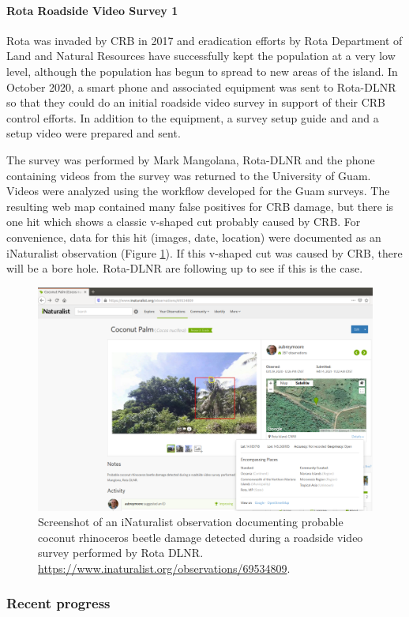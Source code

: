 \documentclass[12pt,letterpaper,english,bibliography=totocnumbered, abstract=on]{scrartcl}
\begin{document}
\clearpage
\paragraph{Rota Roadside Video Survey 1}

Rota was invaded by CRB in 2017 and eradication efforts by Rota Department of Land and Natural Resources have successfully kept the population at a very low level, although the population has begun to spread to new areas of the island. In October 2020, a smart phone and associated equipment was sent to Rota-DLNR so that they could do an initial roadside video survey in support of their CRB control efforts. In addition to the equipment, a survey setup guide and  \cite{aubreymooreSetAutomatedRoadside2020} and a setup video \cite{mooreYouTubeVideoMounting2020} were prepared and sent.
 
The survey was performed by Mark Mangolana, Rota-DLNR and the phone containing videos from the survey was returned to the University of Guam.  Videos were analyzed using the workflow developed for the Guam surveys. The resulting web map contained many false positives for CRB damage, but there is one hit which shows a classic v-shaped cut probably caused by CRB. For convenience, data for this hit (images, date, location) were documented as an iNaturalist observation (Figure \ref{fig:rota-inat-obs}). If this v-shaped cut was caused by CRB, there will be a bore hole. Rota-DLNR are following up to see if this is the case.


\begin{figure}[h]
	\centering
	\includegraphics[width=1\linewidth]{images/Rota-iNat-obs}
	\caption{Screenshot of an iNaturalist observation documenting probable coconut rhinoceros beetle damage detected during a roadside video survey performed by Rota DLNR. \url{https://www.inaturalist.org/observations/69534809}.}
	\label{fig:rota-inat-obs}
\end{figure}

\subsubsection{Recent progress}


\printbibliography
\end{document}
